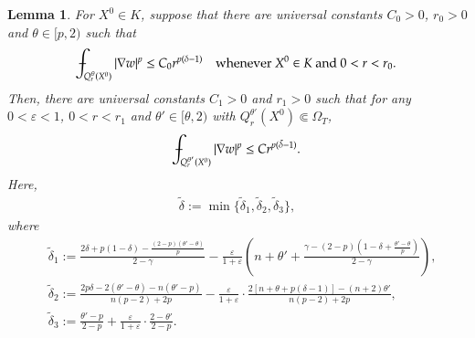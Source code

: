 \documentclass[11pt,oneside,english]{amsart}
\newcommand{\e}{\varepsilon}
\newcommand{\de}{\delta}
\newcommand{\D}{\nabla}
\numberwithin{equation}{section}
\def\Xint#1{\mathchoice
  {\XXint\displaystyle\textstyle{#1}}%
  {\XXint\textstyle\scriptstyle{#1}}%
  {\XXint\scriptstyle\scriptscriptstyle{#1}}%
  {\XXint\scriptscriptstyle\scriptscriptstyle{#1}}%
  \!\int}
\def\XXint#1#2#3{{\setbox0=\hbox{$#1{#2#3}{\int}$}
    \vcenter{\hbox{$#2#3$}}\kern-.5\wd0}}
\def\dashint{\Xint-}
\theoremstyle{plain}
\newtheorem{lemma}{Lemma}
\numberwithin{equation}{section}
\begin{document}
\begin{lemma}\label{lem:iter-sing-1}
    For $X^0\in K$, suppose that there are universal constants $C_0>0$, $r_0>0$ and $\theta\in[p,2)$ such that
    $$
    \dashint_{Q_r^\theta(X^0)}|\D w|^p\le C_0r^{p(\de-1)}\quad\text{whenever $X^0\in K$ and $0<r<r_0$}.
    $$
    Then, there are universal constants $C_1>0$ and $r_1>0$ such that for any $0<\e<1$, $0<r<r_1$ and $\theta'\in[\theta,2)$ with $Q_r^{\theta'}(X^0)\Subset \Omega_T$,
    $$
    \dashint_{Q_r^{\theta'}(X^0)}|\D w|^p\le Cr^{p(\tilde\de-1)}.
    $$
    Here,
    \begin{align}\label{eq:degree}
        \tilde\de:=\min\{\tilde\de_1,\tilde\de_2,\tilde\de_3\}, 
    \end{align}
    where
    \begin{align*}
        &\tilde\de_1:=\frac{2\de+p(1-\de)-\frac{(2-p)(\theta'-\theta)}{p} }{2-\gamma}-\frac{\e}{1+\e}\left(n+\theta'+\frac{\gamma-(2-p)(1-\de+\frac{\theta'-\theta}{p}) }{2-\gamma}  \right),\\
        &\tilde\de_2:=\frac{2p\de-2(\theta'-\theta)-n(\theta'-p)}{n(p-2)+2p}-\frac\e{1+\e}\cdot\frac{2[n+\theta+p(\de-1)]-(n+2)\theta'}{n(p-2)+2p},\\
        &\tilde\de_3:=\frac{\theta'-p}{2-p}+\frac{\e}{1+\e}\cdot\frac{2-\theta'}{2-p}.
    \end{align*}
\end{lemma}
\end{document}
